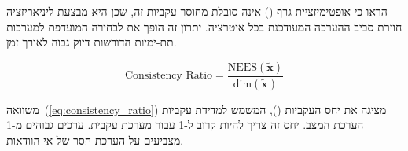 \citet{Kaess2012} הראו כי אופטימיזציית גרף () אינה סובלת מחוסר עקביות זה, שכן היא מבצעת ליניאריזציה חוזרת סביב ההערכה המעודכנת בכל איטרציה. יתרון זה הופך את  לבחירה המועדפת למערכות תת-ימיות הדורשות דיוק גבוה לאורך זמן.

\begin{equation}
\text{Consistency Ratio} = \frac{\text{NEES}(\tilde{\mathbf{x}})}{\text{dim}(\tilde{\mathbf{x}})}
\label{eq:consistency_ratio}
\end{equation}

משוואה~(\ref{eq:consistency_ratio}) מציגה את יחס העקביות (), המשמש למדידת עקביות הערכת המצב. יחס זה צריך להיות קרוב ל-1 עבור מערכת עקבית. ערכים גבוהים מ-1 מצביעים על הערכת חסר של אי-הוודאות.